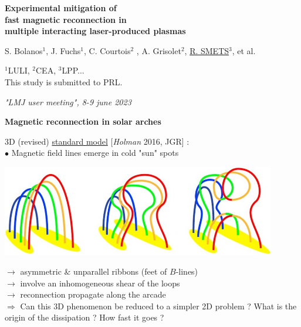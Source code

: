 \documentclass[landscape]{slides}
\begin{document}
\begin{slide}
\thispagestyle{empty}

\begin{center}
{\large \textbf{Experimental mitigation of \\ fast magnetic reconnection in \\[0.4cm] multiple interacting laser-produced plasmas}}

\vspace{3.0cm}

{\large S. Bolanos$^1$, J. Fuchs$^1$, C. Courtois$^2$ , A. Grisolet$^2$, \underline{R. SMETS}$^3$, et al.}
\end{center}

\vspace{1.0cm}

$^1$LULI, $^2$CEA, $^3$LPP...\\
This study is submitted to PRL.

\vspace{2.0cm}

\begin{flushright}
\textit{"LMJ user meeting", 8-9 june 2023}
\end{flushright}

\end{slide}



\begin{slide}
{\large \textbf{Magnetic reconnection in solar arches}}

3D (revised) \underline{standard model} [\textit{Holman} 2016, JGR] : \\[0.4cm]
$\bullet$ Magnetic field lines emerge in cold "sun" spots

\begin{center}
\includegraphics[width=0.9\textwidth]{standard_model.jpg}
\end{center}

$\to$ asymmetric \& unparallel ribbons (feet of $B$-lines) \\
$\to$ involve an inhomogeneous shear of the loops \\
$\to$ reconnection propagate along the arcade \\

$\Rightarrow$ Can this 3D phenomenon be reduced to a simpler 2D problem ?
What is the origin of the dissipation ?
How fast it goes ?

\end{slide}
\end{document}

